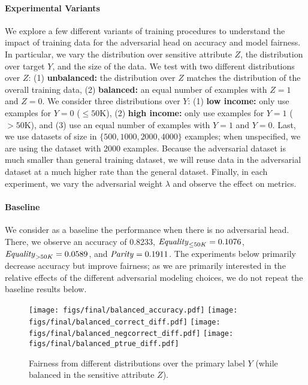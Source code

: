 \documentclass[sigconf,9pt]{acmart}
\begin{document}
\paragraph{Experimental Variants}
We explore a few different variants of training procedures to understand the impact of training data for the adversarial head on accuracy and model fairness.  In particular, we vary the distribution over sensitive attribute $Z$, the distribution over target $Y$, and the size of the data.   We test with two different distributions over $Z$: (1) \textbf{unbalanced:} the distribution over $Z$ matches the distribution of the overall training data, (2) \textbf{balanced:} an equal number of examples with $Z=1$ and $Z=0$.  
We consider three distributions over $Y$:
(1) \textbf{low income:} only use examples for $Y=0$ ($\leq50$K), (2) \textbf{high income:} only use examples for $Y=1$ ($>50$K), and (3) use an equal number of examples with $Y=1$ and $Y=0$.  Last, we use datasets of size in $\{500, 1000, 2000, 4000\}$ examples; when unspecified, we are using the dataset with 2000 examples.  Because the adversarial dataset is much smaller than general training dataset, we will reuse data in the adversarial dataset at a much higher rate than the general dataset.  Finally, in each experiment, we vary the adversarial weight $\lambda$ and observe the effect on metrics.

\paragraph{Baseline}
We consider as a baseline the performance when there is no adversarial head.
There, we observe an accuracy of 0.8233, ${\it Equality}_{\leq50K} = 0.1076$, ${\it Equality}_{>50K} = 0.0589$, and ${\it Parity} = 0.1911$.  
The experiments below primarily decrease accuracy but improve fairness; as we are primarily interested in the relative effects of the different adversarial modeling choices, we do not repeat the baseline results below.

\begin{figure*}[tbh]
    \centering
    \texttt{[image: figs/final/balanced\_accuracy.pdf]}
    \texttt{[image: figs/final/balanced\_correct\_diff.pdf]}
    \texttt{[image: figs/final/balanced\_negcorrect\_diff.pdf]}
    \texttt{[image: figs/final/balanced\_ptrue\_diff.pdf]}
    \vspace{-2mm}
    \caption{Fairness from different distributions over the primary label $Y$ (while balanced in the sensitive attribute $Z$).}
    \label{fig:primaryskew}
\end{figure*}
\end{document}
